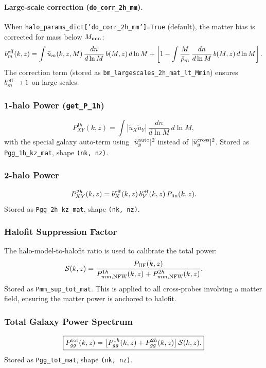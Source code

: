 \documentclass[12pt,a4paper]{article}
\newcommand{\code}[1]{\texttt{\small #1}}
\newcommand{\param}[1]{\texttt{\small #1}}
\begin{document}
\paragraph{Large-scale correction (\param{do\_corr\_2h\_mm}).}
When \param{halo\_params\_dict['do\_corr\_2h\_mm']=True} (default), the
matter bias is corrected for mass below $M_{\rm min}$:
\begin{equation}
  b_m^{\rm eff}(k,z) = \int \tilde u_m(k,z,M)\,\frac{dn}{d\ln M}\,b(M,z)\,d\ln M
  + \left[1 - \int \frac{M}{\bar\rho_m}\,\frac{dn}{d\ln M}\,b(M,z)\,d\ln M\right].
\end{equation}
The correction term (stored as \code{bm\_largescales\_2h\_mat\_lt\_Mmin}) ensures
$b_m^{\rm eff}\to 1$ on large scales.

\subsubsection{1-halo Power (\code{get\_P\_1h})}
\begin{equation}
  P^{1h}_{XY}(k,z) = \int \left|\tilde u_X \tilde u_Y\right|\,\frac{dn}{d\ln M}\,d\ln M,
\end{equation}
with the special galaxy auto-term using $|\tilde u_g^{\rm auto}|^2$ instead of
$|\tilde u_g^{\rm cross}|^2$. Stored as \code{Pgg\_1h\_kz\_mat}, shape \code{(nk, nz)}.

\subsubsection{2-halo Power}
\begin{equation}
  P^{2h}_{XY}(k,z) = b_X^{\rm eff}(k,z)\,b_Y^{\rm eff}(k,z)\,P_{\rm lin}(k,z).
\end{equation}
Stored as \code{Pgg\_2h\_kz\_mat}, shape \code{(nk, nz)}.

\subsubsection{Halofit Suppression Factor}
The halo-model-to-halofit ratio is used to calibrate the total power:
\begin{equation}
  \mathcal{S}(k,z) = \frac{P_{\rm HF}(k,z)}{P^{1h}_{mm,\rm NFW}(k,z)+P^{2h}_{mm,\rm NFW}(k,z)}.
\end{equation}
Stored as \code{Pmm\_sup\_tot\_mat}. This is applied to all cross-probes involving
a matter field, ensuring the matter power is anchored to halofit.

\subsubsection{Total Galaxy Power Spectrum}
\begin{equation}
  \boxed{P^{\rm tot}_{gg}(k,z) = \left[P^{1h}_{gg}(k,z) + P^{2h}_{gg}(k,z)\right]\mathcal{S}(k,z).}
\end{equation}
Stored as \code{Pgg\_tot\_mat}, shape \code{(nk, nz)}.
\end{document}
